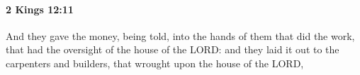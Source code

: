 
		\paragraph{2 Kings 12:11} %
			\label{2KINGS-12-11}

			And they gave the money, being told, into the hands of them that did the work, that had the oversight of the house of the LORD: and they laid it out to the carpenters and builders, that wrought upon the house of the LORD,


